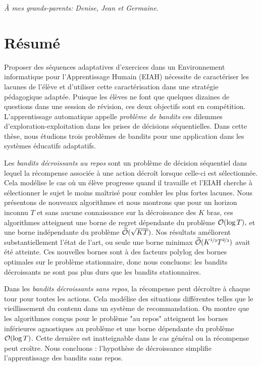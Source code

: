 \cleardoublepage
\hspace{0pt}
\vfill
\begin{flushright}
\emph{À mes grands-parents: Denise, Jean et Germaine}.
\end{flushright}
\vfill
\hspace{0pt}
\cleardoublepage
\section*{R\'esum\'e}
Proposer des séquences adaptatives d'exercices dans un Environnement informatique pour l'Apprentissage Humain (EIAH) nécessite de caractériser les lacunes de l'élève et d'utiliser cette caractérisation dans une stratégie pédagogique adaptée. Puisque les élèves ne font que quelques dizaines de questions dans une session de révision, ces deux objectifs sont en compétition. L'apprentissage automatique appelle \emph{problème de bandits} ces dilemmes d'exploration-exploitation dans les prises de décisions séquentielles. Dans cette thèse, nous étudions trois problèmes de bandits pour une application dans les systèmes éducatifs adaptatifs.

Les \emph{bandits décroissants au repos} sont un problème de décision séquentiel dans lequel la récompense associée à une action décroît lorsque celle-ci est sélectionnée. Cela modélise le cas où un élève progresse quand il travaille et l'EIAH cherche à sélectionner le sujet le moins maîtrisé pour combler les plus fortes lacunes. Nous présentons de nouveaux algorithmes et nous montrons que pour un horizon inconnu $T$ et sans aucune connaissance sur la décroissance des $K$ bras, ces algorithmes atteignent une borne de regret dépendante du problème $\mathcal{O}(\log{T}),$ et une borne indépendante du problème $\widetilde{\mathcal{O}}(\sqrt{KT})$. Nos résultats améliorent substantiellement l'état de l'art, ou seule une borne minimax $\widetilde{\mathcal{O}}(K^{\nicefrac{1}{3}}T^{\nicefrac{2}{3}})$ avait été atteinte. Ces nouvelles bornes sont à des facteurs polylog des bornes optimales sur le problème stationnaire, donc nous concluons: les bandits décroissants ne sont pas plus durs que les bandits stationnaires.

Dans les \emph{bandits décroissants sans repos}, la récompense peut décroître à chaque tour pour toutes les actions. Cela modélise des situations différentes telles que le vieillissement du contenu dans un système de recommandation. On montre que les algorithmes conçus pour le problème "au repos" atteignent les bornes inférieures agnostiques au problème et une borne dépendante du problème $\mathcal{O}(\log{T})$. Cette dernière est inatteignable dans le cas général ou la récompense peut croître. Nous concluons : l'hypothèse de décroissance simplifie l'apprentissage des bandits sans repos. 

